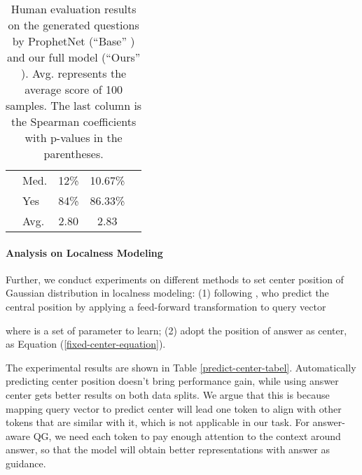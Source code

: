 \documentclass[11pt]{article}
\begin{document}
\begin{table}[t]
\begin{tabular}{@{}clccc@{}}
\multicolumn{1}{c|}{}                           & \multicolumn{1}{l}{Med.}         & 12\%          & \multicolumn{1}{c|}{10.67\%} &                                                                            \\
\multicolumn{1}{c|}{}                           & \multicolumn{1}{l}{Yes}            & 84\%          & \multicolumn{1}{c|}{86.33\%} &                                                                            \\ \cmidrule(lr){2-4}
\multicolumn{1}{c|}{}                           & Avg.                             & 2.80          & \multicolumn{1}{c|}{2.83}    &                                                                            \\ \bottomrule[1pt]
\end{tabular}
\caption{Human evaluation results on the generated questions by ProphetNet (``Base'' ) and our full model (``Ours'' ). Avg. represents the average score of 100 samples. The last column is the Spearman coefficients with p-values in the parentheses.}
\label{human-eval-table}
\end{table}

\paragraph{Analysis on Localness Modeling}
Further, we conduct experiments on different methods to set center position of Gaussian distribution in localness modeling: (1) following \citet{yang-etal-2018-modeling}, who predict the central position by applying a feed-forward transformation to query vector

where  is a set of parameter to learn; (2) adopt the position of answer as center, as Equation (\ref{fixed-center-equation}). 

The experimental results are shown in Table \ref{predict-center-tabel}. Automatically predicting center position doesn't bring performance gain, while using answer center gets better results on both data splits. We argue that this is because mapping query vector to predict center will lead one token to align with other tokens that are similar with it, which is not applicable in our task. For answer-aware QG, we need each token to pay enough attention to the context around answer, so that the model will obtain better representations with answer as guidance.
\end{document}
